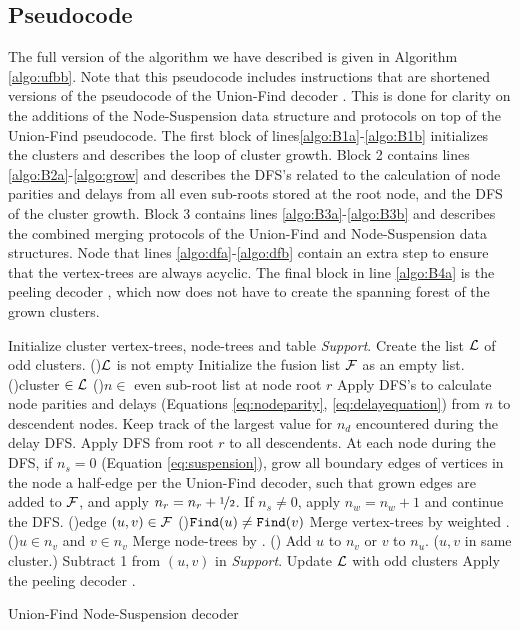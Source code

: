 \subsection{Pseudocode}\label{sec:pseudocode}

The full version of the algorithm we have described is given in Algorithm \ref{algo:ufbb}. Note that this pseudocode includes instructions that are shortened versions of the pseudocode of the Union-Find decoder \cite{delfosse2017almost}. This is done for clarity on the additions of the Node-Suspension data structure and protocols on top of the Union-Find pseudocode. The first block  of lines\ref{algo:B1a}-\ref{algo:B1b} initializes the clusters and describes the loop of cluster growth. Block 2 contains lines \ref{algo:B2a}-\ref{algo:grow} and describes the DFS's related to the calculation of node parities and delays from all even sub-roots stored at the root node, and the DFS of the cluster growth. Block 3 contains lines \ref{algo:B3a}-\ref{algo:B3b} and describes the combined merging protocols of the Union-Find and Node-Suspension data structures. Node that lines \ref{algo:dfa}-\ref{algo:dfb} contain an extra step to ensure that the vertex-trees are always acyclic. The final block in line \ref{algo:B4a} is the peeling decoder \cite{delfosse2017linear}, which now does not have to create the spanning forest of the grown clusters. 
\begin{algorithm}[htb]
    \BlankLine
    \BlankLine
    Initialize cluster vertex-trees, node-trees and table \emph{Support}.\;\label{algo:B1a}
    Create the list $\mathcal{L}$ of odd clusters.\;
    \While(){$\mathcal{L}$ is not empty}{
      Initialize the fusion list $\mathcal{F}$ as an empty list.\;\label{algo:B1b}
      \For(){cluster $\in\mathcal{L}$ \label{algo:B2a}}{
        \For(){$n \in$ even sub-root list at node root $r$}{
          Apply DFS's to calculate node parities and delays (Equations \eqref{eq:nodeparity}, \eqref{eq:delayequation}) from $n$ to descendent nodes. Keep track of the largest value for $n_d$ encountered during the delay DFS.\;\label{algo:pdc}
        }
        Apply DFS from root $r$ to all descendents. At each node during the DFS, if $n_s=0$ (Equation \eqref{eq:suspension}), grow all boundary edges of vertices in the node a half-edge per the Union-Find decoder, such that grown edges are added to $\mathcal{F}$, and apply $n_r=n_r+\nicefrac{1}{2}$. If $n_s\neq0$, apply $n_w=n_w+1$ and continue the DFS.\;\label{algo:grow}
      }
      \For(){edge $(u,v) \in \mathcal{F}$\label{algo:B3a}}{
        \eIf(){$\texttt{Find}(u)\neq\texttt{Find}(v)$}{
          Merge vertex-trees by weighted .\;
          \eIf(){$u \in n_v$ and $v \in n_v$\label{algo:joina}}{
            Merge node-trees by .\;
          }(){
            Add $u$ to $n_v$ or $v$ to $n_u$.\;\label{algo:joinb}
          }
        }($u,v$ in same cluster.\label{algo:dfa}){
          Subtract 1 from $(u,v)$ in \emph{Support}.\;\label{algo:dfb}
        }
      }
      Update $\mathcal{L}$ with odd clusters\; \label{algo:B3b}
    }
    Apply the peeling decoder \cite{delfosse2017linear}.\label{algo:B4a}
    \caption{Union-Find Node-Suspension decoder}\label{algo:ufbb}
  \end{algorithm}
    